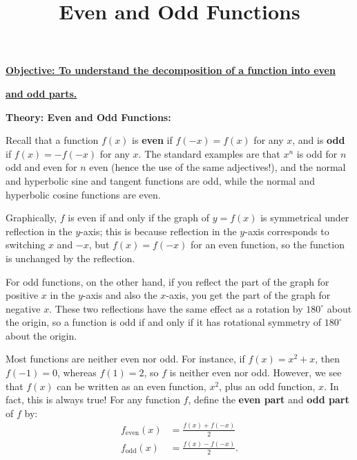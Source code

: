 \documentclass{article}
\begin{document}
\title{Even and Odd Functions}
\date{}

\maketitle
\thispagestyle{empty}

\Large

\textbf{\underline{Objective: To understand the decomposition of a function into even}}

\textbf{\underline{and odd parts.}}






\vspace{5mm}







\textbf{Theory: Even and Odd Functions:}\bigskip


Recall that a function $f(x)$ is \textbf{even} if $f(-x)=f(x)$ for any $x$, and is \textbf{odd} if $f(x)=-f(-x)$ for any $x$. The standard examples are that $x^n$ is odd for $n$ odd and even for $n$ even (hence the use of the same adjectives!), and the normal and hyperbolic sine and tangent functions are odd, while the normal and hyperbolic cosine functions are even.

Graphically, $f$ is even if and only if the graph of $y=f(x)$ is symmetrical under reflection in the $y$-axis; this is because reflection in the $y$-axis corresponds to switching $x$ and $-x$, but $f(x)=f(-x)$ for an even function, so the function is unchanged by the reflection.

For odd functions, on the other hand, if you reflect the part of the graph for positive $x$ in the $y$-axis and also the $x$-axis, you get the part of the graph for negative $x$. These two reflections have the same effect as a rotation by $180^\circ$ about the origin, so a function is odd if and only if it has rotational symmetry of $180^\circ$ about the origin.

Most functions are neither even nor odd. For instance, if $f(x)=x^2+x$, then $f(-1)=0$, whereas $f(1)=2$, so $f$ is neither even nor odd. However, we see that $f(x)$ can be written as an even function, $x^2$, plus an odd function, $x$. In fact, this is always true! For any function $f$, define the \textbf{even part} and \textbf{odd part} of $f$ by:
\begin{align*}
	f_\mathrm{even}(x)&=\frac{f(x)+f(-x)}{2}\\
	f_\mathrm{odd}(x)&=\frac{f(x)-f(-x)}{2}.
\end{align*}
\end{document}
